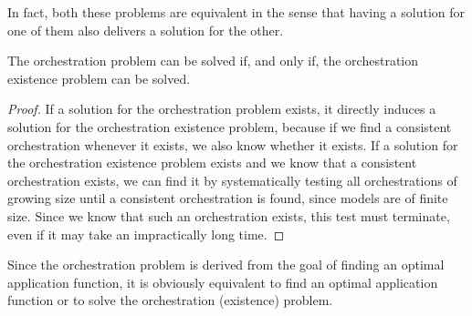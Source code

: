 In fact, both these problems are equivalent in the sense that having a solution for one of them also delivers a solution for the other.
\begin{theorem}
    \label{theorem:orchestrationproblemequivalence}
    The orchestration problem can be solved if, and only if, the orchestration existence problem can be solved.
\end{theorem}
\begin{proof}
    If a solution for the orchestration problem exists, it directly induces a solution for the orchestration existence problem, because if we find a consistent orchestration whenever it exists, we also know whether it exists.
    If a solution for the orchestration existence problem exists and we know that a consistent orchestration exists, we can find it by systematically testing all orchestrations of growing size until a consistent orchestration is found, since models are of finite size. Since we know that such an orchestration exists, this test must terminate, even if it may take an impractically long time.
\end{proof}

Since the orchestration problem is derived from the goal of finding an optimal application function, it is obviously equivalent to find an optimal application function or to solve the orchestration (existence) problem.


